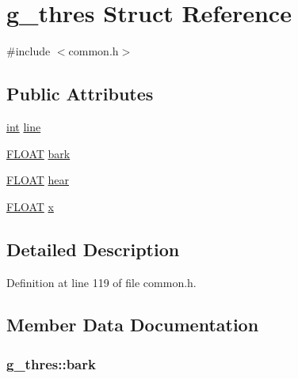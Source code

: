 \hypertarget{structg__thres}{}\section{g\+\_\+thres Struct Reference}
\label{structg__thres}


{\ttfamily \#include $<$common.\+h$>$}

\subsection*{Public Attributes}
\begin{DoxyCompactItemize}
\item 
\hyperlink{xmltok_8h_a5a0d4a5641ce434f1d23533f2b2e6653}{int} \hyperlink{structg__thres_a83b4b3155ab893f1d3bce92cc9b7d635}{line}
\item 
\hyperlink{twolame_2libtwolame_2common_8h_ae8690abbffa85934d64d545920e2b108}{F\+L\+O\+AT} \hyperlink{structg__thres_a01782d805191c5cee4a3a72393e434d5}{bark}
\item 
\hyperlink{twolame_2libtwolame_2common_8h_ae8690abbffa85934d64d545920e2b108}{F\+L\+O\+AT} \hyperlink{structg__thres_a159fe6f7ab328b2b37c129c1a0762ecf}{hear}
\item 
\hyperlink{twolame_2libtwolame_2common_8h_ae8690abbffa85934d64d545920e2b108}{F\+L\+O\+AT} \hyperlink{structg__thres_a19304eecad54259980b86a18ea398cfb}{x}
\end{DoxyCompactItemize}


\subsection{Detailed Description}


Definition at line 119 of file common.\+h.



\subsection{Member Data Documentation}
\subsubsection[{\texorpdfstring{bark}{bark}}]{ g\+\_\+thres\+::bark}\hypertarget{structg__thres_a01782d805191c5cee4a3a72393e434d5}{}\label{structg__thres_a01782d805191c5cee4a3a72393e434d5}


